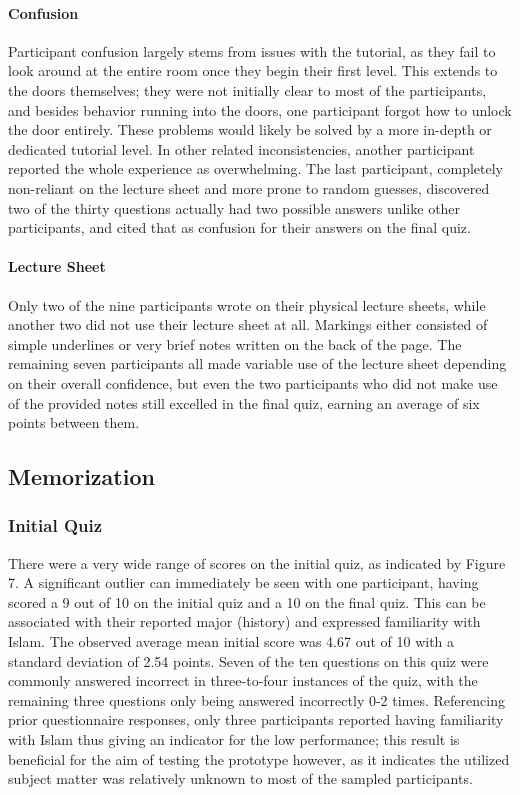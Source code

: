 \documentclass{vgtc}                          %
\begin{document}
\paragraph{Confusion} Participant confusion largely stems from issues with the tutorial, as they fail to look around at the entire room once they begin their first level. This extends to the doors themselves; they were not initially clear to most of the participants, and besides behavior running into the doors, one participant forgot how to unlock the door entirely. These problems would likely be solved by a more in-depth or dedicated tutorial level. In other related inconsistencies, another participant reported the whole experience as overwhelming. The last participant, completely non-reliant on the lecture sheet and more prone to random guesses, discovered two of the thirty questions actually had two possible answers unlike other participants, and cited that as confusion for their answers on the final quiz.

\paragraph{Lecture Sheet} Only two of the nine participants wrote on their physical lecture sheets, while another two did not use their lecture sheet at all. Markings either consisted of simple underlines or very brief notes written on the back of the page. The remaining seven participants all made variable use of the lecture sheet depending on their overall confidence, but even the two participants who did not make use of the provided notes still excelled in the final quiz, earning an average of six points between them.

\subsection{Memorization}

\subsubsection{Initial Quiz}

There were a very wide range of scores on the initial quiz, as indicated by Figure 7. A significant outlier can immediately be seen with one participant, having scored a 9 out of 10 on the initial quiz and a 10 on the final quiz. This can be associated with their reported major (history) and expressed familiarity with Islam. The observed average mean initial score was 4.67 out of 10 with a standard deviation of 2.54 points. Seven of the ten questions on this quiz were commonly answered incorrect in three-to-four instances of the quiz, with the remaining three questions only being answered incorrectly 0-2 times. Referencing prior questionnaire responses, only three participants reported having familiarity with Islam thus giving an indicator for the low performance; this result is beneficial for the aim of testing the prototype however, as it indicates the utilized subject matter was relatively unknown to most of the sampled participants.
\end{document}
